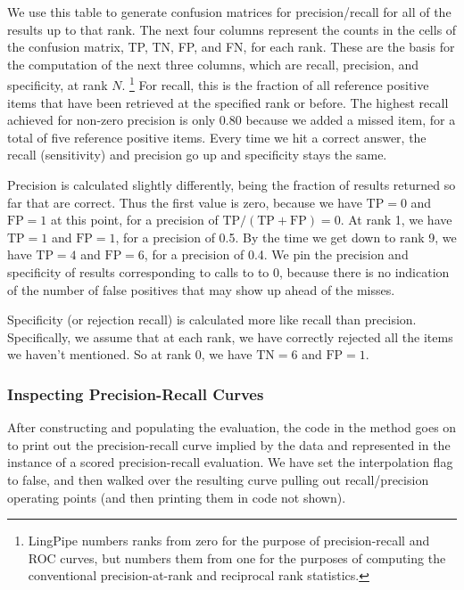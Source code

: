 We use this table to generate confusion matrices for precision/recall for
all of the results up to that rank.  The next four columns represent
the counts in the cells of the confusion matrix, TP, TN, FP,
and FN, for each rank.  These are the basis for the computation of the
next three columns, which are recall, precision, and specificity, at
rank $N$.%
%
\footnote{LingPipe numbers ranks from zero for the purpose of
  precision-recall and ROC curves, but numbers them from one for the
  purposes of computing the conventional precision-at-rank and
  reciprocal rank statistics.}
%
For recall, this is the fraction of all reference positive items that
have been retrieved at the specified rank or before.  The highest
recall achieved for non-zero precision is only 0.80 because we added
a missed item, for a total of five reference positive items.  Every
time we hit a correct answer, the recall (sensitivity) and precision
go up and specificity stays the same.

Precision is calculated slightly differently, being the fraction of
results returned so far that are correct.  Thus the first value is
zero, because we have $\mbox{TP}=0$ and $\mbox{FP}=1$ at this point,
for a precision of $\mbox{TP}/(\mbox{TP}+\mbox{FP}) = 0$.  At rank 1,
we have $\mbox{TP}=1$ and $\mbox{FP}=1$, for a precision of 0.5.  By
the time we get down to rank 9, we have $\mbox{TP}=4$ and
$\mbox{FP}=6$, for a precision of 0.4.  We pin the precision and
specificity of results corresponding to calls to  to
0, because there is no indication of the number of false positives
that may show up ahead of the misses.

Specificity (or rejection recall) is calculated more like recall than
precision.  Specifically, we assume that at each rank, we have
correctly rejected all the items we haven't mentioned.  So at rank 0,
we have $\mbox{TN} = 6$ and $\mbox{FP}=1$.

\subsubsection{Inspecting Precision-Recall Curves}

After constructing and populating the evaluation, the code in the
 method goes on to print out the precision-recall curve
implied by the data and represented in the instance  of
a scored precision-recall evaluation.
%
%
We have set the interpolation flag to false, and then walked over the
resulting curve pulling out recall/precision operating points (and
then printing them in code not shown).  

